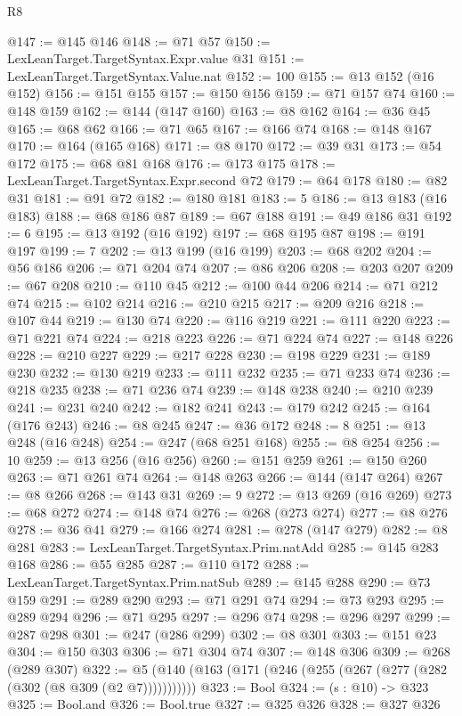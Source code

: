 \begin{lexlean}{R8}
\begin{coremodule}
{{{{{{{{{{{{{{{{{{{{{{{@147 := @145 @146
@148 := @71 @57
@150 := LexLeanTarget.TargetSyntax.Expr.value @31
@151 := LexLeanTarget.TargetSyntax.Value.nat
@152 := 100
@155 := @13 @152 (@16 @152)
@156 := @151 @155
@157 := @150 @156
@159 := @71 @157 @74
@160 := @148 @159
@162 := @144 (@147 @160)
@163 := @8 @162
@164 := @36 @45
@165 := @68 @62
@166 := @71 @65
@167 := @166 @74
@168 := @148 @167
@170 := @164 (@165 @168)
@171 := @8 @170
@172 := @39 @31
@173 := @54 @172
@175 := @68 @81 @168
@176 := @173 @175
@178 := LexLeanTarget.TargetSyntax.Expr.second @72
@179 := @64 @178
@180 := @82 @31
@181 := @91 @72
@182 := @180 @181
@183 := 5
@186 := @13 @183 (@16 @183)
@188 := @68 @186 @87
@189 := @67 @188
@191 := @49 @186 @31
@192 := 6
@195 := @13 @192 (@16 @192)
@197 := @68 @195 @87
@198 := @191 @197
@199 := 7
@202 := @13 @199 (@16 @199)
@203 := @68 @202
@204 := @56 @186
@206 := @71 @204 @74
@207 := @86 @206
@208 := @203 @207
@209 := @67 @208
@210 := @110 @45
@212 := @100 @44 @206
@214 := @71 @212 @74
@215 := @102 @214
@216 := @210 @215
@217 := @209 @216
@218 := @107 @44
@219 := @130 @74
@220 := @116 @219
@221 := @111 @220
@223 := @71 @221 @74
@224 := @218 @223
@226 := @71 @224 @74
@227 := @148 @226
@228 := @210 @227
@229 := @217 @228
@230 := @198 @229
@231 := @189 @230
@232 := @130 @219
@233 := @111 @232
@235 := @71 @233 @74
@236 := @218 @235
@238 := @71 @236 @74
@239 := @148 @238
@240 := @210 @239
@241 := @231 @240
@242 := @182 @241
@243 := @179 @242
@245 := @164 (@176 @243)
@246 := @8 @245
@247 := @36 @172
@248 := 8
@251 := @13 @248 (@16 @248)
@254 := @247 (@68 @251 @168)
@255 := @8 @254
@256 := 10
@259 := @13 @256 (@16 @256)
@260 := @151 @259
@261 := @150 @260
@263 := @71 @261 @74
@264 := @148 @263
@266 := @144 (@147 @264)
@267 := @8 @266
@268 := @143 @31
@269 := 9
@272 := @13 @269 (@16 @269)
@273 := @68 @272
@274 := @148 @74
@276 := @268 (@273 @274)
@277 := @8 @276
@278 := @36 @41
@279 := @166 @274
@281 := @278 (@147 @279)
@282 := @8 @281
@283 := LexLeanTarget.TargetSyntax.Prim.natAdd
@285 := @145 @283 @168
@286 := @55 @285
@287 := @110 @172
@288 := LexLeanTarget.TargetSyntax.Prim.natSub
@289 := @145 @288
@290 := @73 @159
@291 := @289 @290
@293 := @71 @291 @74
@294 := @73 @293
@295 := @289 @294
@296 := @71 @295
@297 := @296 @74
@298 := @296 @297
@299 := @287 @298
@301 := @247 (@286 @299)
@302 := @8 @301
@303 := @151 @23
@304 := @150 @303
@306 := @71 @304 @74
@307 := @148 @306
@309 := @268 (@289 @307)
@322 := @5 (@140 (@163 (@171 (@246 (@255 (@267 (@277 (@282 (@302 (@8 @309 (@2 @7)))))))))))
@323 := Bool
@324 := (s : @10) -> @323
@325 := Bool.and
@326 := Bool.true
@327 := @325 @326
@328 := @327 @326
}}}}}}}}}}}}}}}}}}}}}}}
\end{coremodule}
\end{lexlean}
